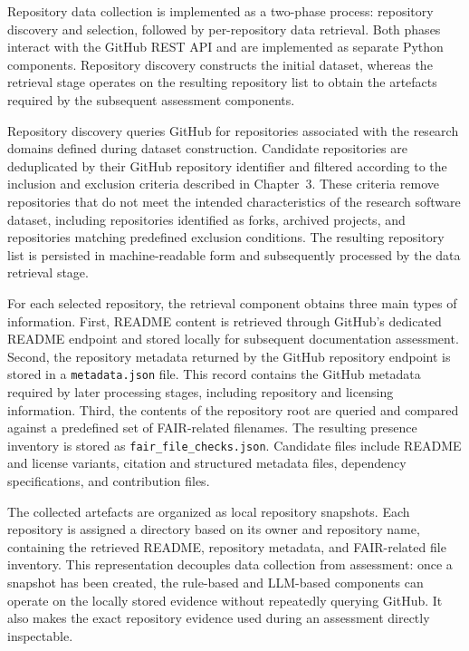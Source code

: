Repository data collection is implemented as a two-phase process:
repository discovery and selection, followed by per-repository data
retrieval. Both phases interact with the GitHub REST API and are
implemented as separate Python components. Repository discovery
constructs the initial dataset, whereas the retrieval stage operates
on the resulting repository list to obtain the artefacts required by
the subsequent assessment components.

Repository discovery queries GitHub for repositories associated with
the research domains defined during dataset construction. Candidate
repositories are deduplicated by their GitHub repository identifier
and filtered according to the inclusion and exclusion criteria
described in Chapter~3. These criteria remove repositories that do not
meet the intended characteristics of the research software dataset,
including repositories identified as forks, archived projects, and
repositories matching predefined exclusion conditions. The resulting
repository list is persisted in machine-readable form and subsequently
processed by the data retrieval stage.

For each selected repository, the retrieval component obtains three
main types of information. First, README content is retrieved through
GitHub's dedicated README endpoint and stored locally for subsequent
documentation assessment. Second, the repository metadata returned by
the GitHub repository endpoint is stored in a \texttt{metadata.json}
file. This record contains the GitHub metadata required by later
processing stages, including repository and licensing information.
Third, the contents of the repository root are queried and compared
against a predefined set of FAIR-related filenames. The resulting
presence inventory is stored as
\texttt{fair\_file\_checks.json}. Candidate files include README and
license variants, citation and structured metadata files, dependency
specifications, and contribution files.

The collected artefacts are organized as local repository snapshots.
Each repository is assigned a directory based on its owner and
repository name, containing the retrieved README, repository metadata,
and FAIR-related file inventory. This representation decouples data
collection from assessment: once a snapshot has been created, the
rule-based and LLM-based components can operate on the locally stored
evidence without repeatedly querying GitHub. It also makes the exact
repository evidence used during an assessment directly inspectable.

